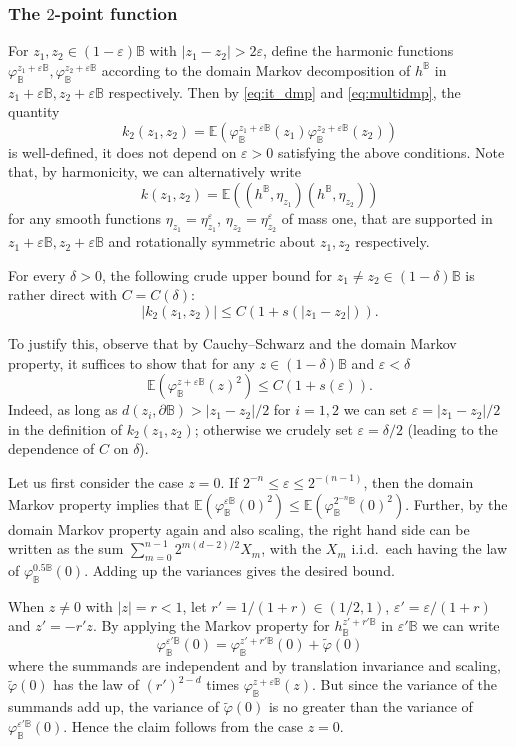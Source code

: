 \documentclass[10pt]{amsart}
\theoremstyle{definition}
\newcommand{\E}{\mathbb{E}}
\newcommand{\B}{\mathbb{B}}\let\D\B\let\Ub\B
\let\eps\varepsilon
\begin{document}
\subsubsection*{The $2$-point function} For $z_1,z_2\in (1-\eps)\B$ with $|z_1-z_2|>2\eps$, define the harmonic functions $\varphi_\B^{z_1+\eps\B}, \varphi_\B^{z_2+\eps\B}$ according to the domain Markov decomposition of $h^\B$ in $z_1+\eps\B,z_2+\eps\B$ respectively. Then by \eqref{eq:it_dmp} and \eqref{eq:multidmp}, the quantity
\[
k_2(z_1,z_2)=\E(\varphi_\B^{z_1+\eps\B}(z_1)\varphi_\B^{z_2+\eps\B}(z_2))
\]
is well-defined, \ie it does not depend on $\eps > 0$ satisfying the above conditions. Note that, by harmonicity, we can alternatively write
\begin{equation}\label{k:conv}k(z_1,z_2)=\E((h^\B,\eta_{z_1})(h^\B,\eta_{z_2}))\end{equation} for any smooth functions { $\eta_{z_1}=\eta_{z_1}^\eps$, $\eta_{z_2}=\eta_{z_2}^\eps$ }of mass one, that are supported in $z_1+\eps\B,z_2+\eps\B$ and rotationally symmetric about $z_1,z_2$ respectively.

For every $\delta > 0$, the following crude upper bound for $z_1\ne z_2\in (1-\delta)\B$ is rather direct with $C = C(\delta)$:
\begin{equation}\label{eq:var_bounds} |k_2(z_1,z_2)|\le C(1+s(|z_1-z_2|)). \end{equation}

To justify this, observe that by Cauchy--Schwarz and the domain Markov property, it suffices to show that for any $z\in (1-\delta)\B$ and $\eps < \delta$
\begin{equation}\label{eq:circlebound} \E(\varphi_\B^{z+\eps\B}(z)^2)\le C(1+s(\eps)).\end{equation}
Indeed, as long as $d(z_i,\partial \D)>|z_1-z_2|/2$ for $i=1,2$ we can set $\eps=|z_1-z_2|/2$ in the definition of $k_2(z_1,z_2)$; otherwise we crudely set $\eps = \delta/2$ (leading to the dependence of $C$ on $\delta$).

Let us first consider the case $z=0$. If $2^{-n}\le \eps\le 2^{-(n-1)}$, then the domain Markov property implies that $\E(\varphi_\B^{\eps\B}(0)^2)\le \E(\varphi_\B^{2^{-n}\B}(0)^2)$. Further, by the domain Markov property again and also scaling, the right hand side can be written as the sum $\sum_{m=0}^{n-1} 2^{m(d-2)/2} X_m$, with the $X_m$ i.i.d.\ each having the law of $\varphi_{\B}^{0.5\B}(0)$. Adding up the variances gives the desired bound.

When $z\ne 0$ with $|z|=r<1$, let $r' = 1/(1+r)\in (1/2,1)$, $\eps' = \eps/(1+r)$ and $z'=-r'z$.
By applying the Markov property for $h_\B^{z'+r'\B}$ in $\eps'\B$ we can write
\[
\varphi_\B^{\eps'\B}(0) = \varphi_\B^{z' +r'\B}(0) + \tilde{\varphi}(0)
\]
where the summands are independent and by translation invariance and scaling, $\tilde{\varphi}(0)$ has the law of $(r')^{2-d}$ times $\varphi_\B^{z+\eps\B}(z)$. But since the variance of the summands add up, the variance of $\tilde{\varphi}(0)$ is no greater than the variance of $\varphi_\B^{\eps'\B}(0)$. Hence the claim follows from the case $z = 0$.
\end{document}

